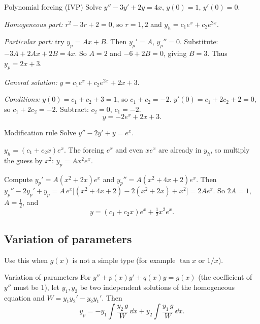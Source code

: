 \begin{examplebox}{Polynomial forcing (IVP)}
Solve $y'' - 3y' + 2y = 4x$, \; $y(0)=1$, \; $y'(0)=0$.

\emph{Homogeneous part:} $r^2 - 3r + 2 = 0$, so $r=1,2$ and $y_h = c_1e^{x} + c_2e^{2x}$.

\emph{Particular part:} try $y_p = Ax + B$. Then $y_p' = A$, $y_p''=0$. Substitute: $-3A + 2Ax + 2B = 4x$. So $A = 2$ and $-6 + 2B = 0$, giving $B=3$. Thus $y_p = 2x + 3$.

\emph{General solution:} $y = c_1e^{x} + c_2e^{2x} + 2x + 3$.

\emph{Conditions:} $y(0) = c_1 + c_2 + 3 = 1$, so $c_1 + c_2 = -2$. $y'(0) = c_1 + 2c_2 + 2 = 0$, so $c_1 + 2c_2 = -2$. Subtract: $c_2 = 0$, $c_1 = -2$.
\[ y = -2e^{x} + 2x + 3. \]
\end{examplebox}

\begin{examplebox}{Modification rule}
Solve $y'' - 2y' + y = e^{x}$.

$y_h = (c_1 + c_2x)e^{x}$. The forcing $e^{x}$ and even $xe^{x}$ are already in $y_h$, so multiply the guess by $x^2$: $y_p = Ax^2e^{x}$.

Compute $y_p' = A(x^2 + 2x)e^{x}$ and $y_p'' = A(x^2 + 4x + 2)e^{x}$. Then
$y_p'' - 2y_p' + y_p = A\,e^{x}\big[(x^2+4x+2) - 2(x^2+2x) + x^2\big] = 2Ae^{x}$.
So $2A = 1$, $A = \tfrac12$, and
\[ y = (c_1 + c_2x)e^{x} + \tfrac12x^2e^{x}. \]
\end{examplebox}

\subsection{Variation of parameters}

Use this when $g(x)$ is not a simple type (for example $\tan x$ or $1/x$).

\begin{methodbox}{Variation of parameters}
For $y'' + p(x)y' + q(x)y = g(x)$ (the coefficient of $y''$ must be 1), let $y_1, y_2$ be two independent solutions of the homogeneous equation and $W = y_1y_2' - y_2y_1'$. Then
\[ y_p = -y_1\int \frac{y_2\,g}{W}\,\dd x + y_2\int \frac{y_1\,g}{W}\,\dd x . \]
\end{methodbox}

